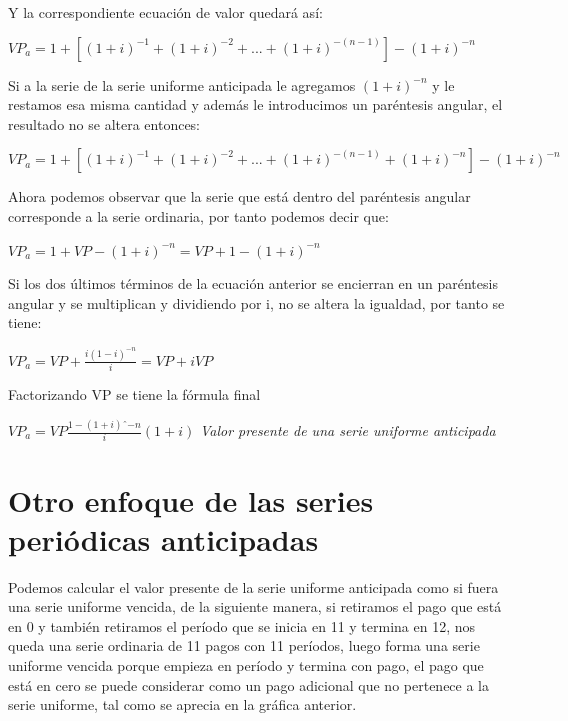 	Y la correspondiente ecuación de valor quedará así:\\
	\begin{center}

		$VP_{a}=1+[(1+i)^{-1}+(1+i)^{-2}+...+(1+i)^{-(n-1)} ] -(1+i)^{-n}$

	\end{center}

	Si a la serie de la serie uniforme anticipada le agregamos $(1+i)^{-n}$ y le restamos esa misma cantidad y además le introducimos un paréntesis angular, el resultado no se altera entonces:

	\vspace{5mm}

$VP_{a}= 1+[(1+i)^{-1} +(1+i)^{-2}+...+(1+i)^{-(n-1)} +(1+i)^{-n} ] -(1+i)^{-n}$

	\vspace{5mm}
	Ahora podemos observar que la serie que está dentro del paréntesis angular corresponde a la serie ordinaria, por tanto podemos decir que:

	\vspace{5mm}

$VP_{a}= 1+VP-(1+i)^{-n}=VP+1-(1+i)^{-n}$
	\vspace{5mm}

	Si los dos últimos términos de la ecuación anterior se encierran en un paréntesis angular y se multiplican y dividiendo por i, no se altera la igualdad, por tanto se tiene:

	\vspace{5mm}
$VP_{a}=VP+\frac{i (1-i)^{-n} }{i}=VP+iVP$
	\vspace{5mm}

	Factorizando VP se tiene la fórmula final

	\vspace{5mm}
$VP_{a}=VP \frac{1-(1+i)ˆ{-n}}{i}(1+i)$ \hspace{35pt}\textit{Valor presente de una serie uniforme anticipada}\\
	\vspace{5mm}


	


	\section{Otro enfoque de las series periódicas anticipadas}
	Podemos calcular el valor presente de la serie uniforme anticipada como si fuera una serie uniforme vencida, de la siguiente manera, si retiramos el pago que está en 0 y también retiramos el período que se inicia en 11 y termina en 12, nos queda una serie ordinaria de 11 pagos con 11 períodos, luego forma una serie uniforme vencida porque empieza en período y termina con pago, el pago que está en cero se puede considerar como un pago adicional que no pertenece a la serie uniforme, tal como se aprecia en la gráfica anterior.\\

